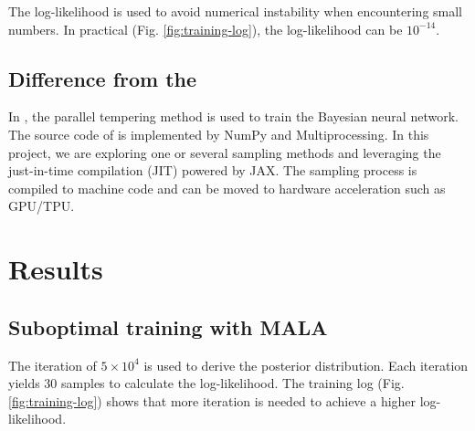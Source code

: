 \documentclass{article}
\begin{document}
The log-likelihood is used to avoid numerical instability when encountering small numbers. In practical (Fig. \ref{fig:training-log}), the log-likelihood can be $10^{-14}$. 

\subsection{Difference from the \cite{chandra2021bayesian}}

In \cite{chandra2021bayesian}, the parallel tempering method is used to train the Bayesian neural network. The source code of \cite{chandra2019langevin} is implemented by NumPy and Multiprocessing. In this project, we are exploring one or several sampling methods and leveraging the just-in-time compilation (JIT) powered by JAX\cite{jax2018github}. The sampling process is compiled to machine code and can be moved to hardware acceleration such as GPU/TPU.


\section{Results}

\subsection{Suboptimal training with MALA}

The iteration of $5\times 10^4$ is used to derive the posterior distribution. Each iteration yields $30$ samples to calculate the log-likelihood. The training log (Fig. \ref{fig:training-log}) shows that more iteration is needed to achieve a higher log-likelihood. 
\end{document}
